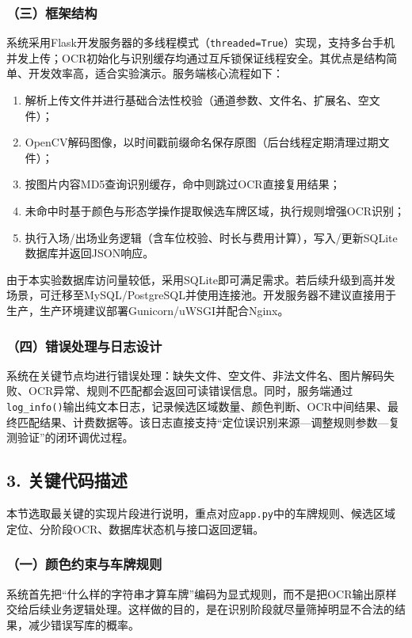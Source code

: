 \documentclass[12pt,a4paper]{article}
\begin{document}
\subsubsection*{（三）框架结构}
系统采用Flask开发服务器的多线程模式（\texttt{threaded=True}）实现，支持多台手机并发上传；OCR初始化与识别缓存均通过互斥锁保证线程安全。其优点是结构简单、开发效率高，适合实验演示。服务端核心流程如下：
\begin{enumerate}
  \item 解析上传文件并进行基础合法性校验（通道参数、文件名、扩展名、空文件）；
  \item OpenCV解码图像，以时间戳前缀命名保存原图（后台线程定期清理过期文件）；
  \item 按图片内容MD5查询识别缓存，命中则跳过OCR直接复用结果；
  \item 未命中时基于颜色与形态学操作提取候选车牌区域，执行规则增强OCR识别；
  \item 执行入场/出场业务逻辑（含车位校验、时长与费用计算），写入/更新SQLite数据库并返回JSON响应。
\end{enumerate}
由于本实验数据库访问量较低，采用SQLite即可满足需求。若后续升级到高并发场景，可迁移至MySQL/PostgreSQL并使用连接池。开发服务器不建议直接用于生产，生产环境建议部署Gunicorn/uWSGI并配合Nginx。

\subsubsection*{（四）错误处理与日志设计}
系统在关键节点均进行错误处理：缺失文件、空文件、非法文件名、图片解码失败、OCR异常、规则不匹配都会返回可读错误信息。同时，服务端通过\texttt{log\_info()}输出纯文本日志，记录候选区域数量、颜色判断、OCR中间结果、最终匹配结果、计费数据等。该日志直接支持“定位误识别来源—调整规则参数—复测验证”的闭环调优过程。

\subsection*{3. 关键代码描述}
本节选取最关键的实现片段进行说明，重点对应\texttt{app.py}中的车牌规则、候选区域定位、分阶段OCR、数据库状态机与接口返回逻辑。

\subsubsection*{（一）颜色约束与车牌规则}
系统首先把“什么样的字符串才算车牌”编码为显式规则，而不是把OCR输出原样交给后续业务逻辑处理。这样做的目的，是在识别阶段就尽量筛掉明显不合法的结果，减少错误写库的概率。
\end{document}
